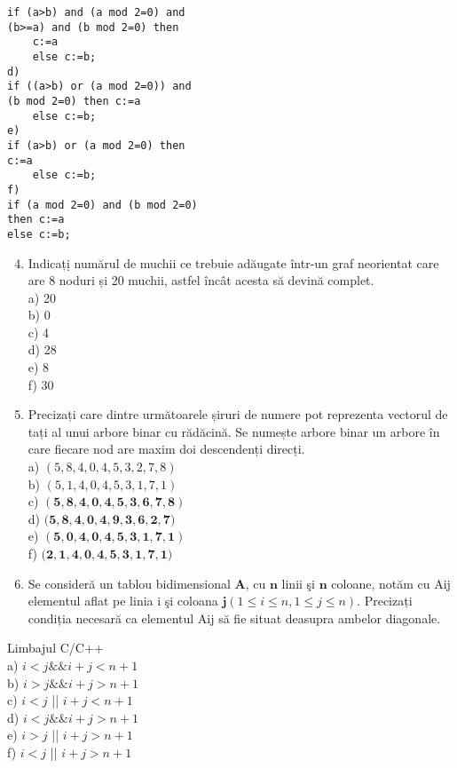 \begin{verbatim}
if (a>b) and (a mod 2=0) and
(b>=a) and (b mod 2=0) then
    c:=a
    else c:=b;
d)
if ((a>b) or (a mod 2=0)) and
(b mod 2=0) then c:=a
    else c:=b;
e)
if (a>b) or (a mod 2=0) then
c:=a
    else c:=b;
f)
if (a mod 2=0) and (b mod 2=0)
then c:=a
else c:=b;
\end{verbatim}

\begin{enumerate}
  \setcounter{enumi}{3}
  \item Indicațị numărul de muchii ce trebuie adăugate într-un graf neorientat care are 8 noduri și 20 muchii, astfel încât acesta să devină complet.\\
a) 20\\
b) 0\\
c) 4\\
d) 28\\
e) 8\\
f) 30
  \item Precizați care dintre următoarele șiruri de numere pot reprezenta vectorul de tați al unui arbore binar cu rădăcină. Se numește arbore binar un arbore în care fiecare nod are maxim doi descendenți direcți.\\
a) $(5,8,4,0,4,5,3,2,7,8)$\\
b) $(5,1,4,0,4,5,3,1,7,1)$\\
c) $(\mathbf{5 , 8 , 4 , 0 , 4 , 5 , 3 , 6 , 7 , 8})$\\
d) $(\mathbf{5 , 8 , 4 , 0 , 4 , 9 , 3 , 6 , 2 , 7 )}$\\
e) $\mathbf{( 5 , 0 , 4 , 0 , 4 , 5 , 3 , 1 , 7 , 1 )}$\\
f) $(\mathbf{2 , 1 , 4 , 0 , 4 , 5 , 3 , 1 , 7 , 1 )}$
  \item Se consideră un tablou bidimensional $\mathbf{A}$, cu $\mathbf{n}$ linii şi $\mathbf{n}$ coloane, notăm cu Aij elementul aflat pe linia i şi coloana $\mathbf{j}(1 \leq i \leq n, 1 \leq j \leq n)$. Precizați condiția necesară ca elementul Aij să fie situat deasupra ambelor diagonale.
\end{enumerate}

Limbajul C/C++\\
a) $i<j \& \& i+j<n+1$\\
b) $i>j \& \& i+j>n+1$\\
c) $i<j$ || $i+j<n+1$\\
d) $i<j \& \& i+j>n+1$\\
e) $i>j$ || $i+j>n+1$\\
f) $i<j$ || $i+j>n+1$

